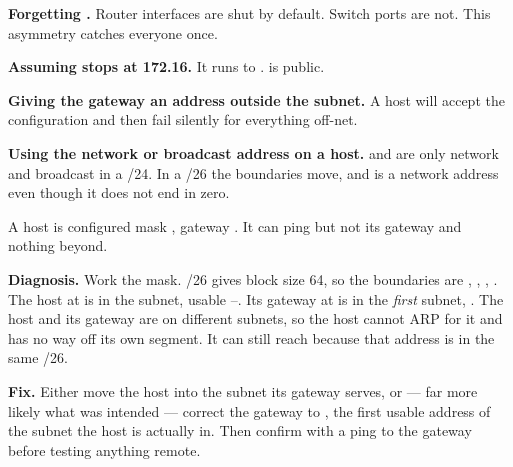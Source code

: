 \begin{pitfall}
\begin{tight}
  \item \textbf{Forgetting .} Router interfaces are shut by
        default. Switch ports are not. This asymmetry catches everyone once.
  \item \textbf{Assuming  stops at 172.16.} It runs to
        .  is public.
  \item \textbf{Giving the gateway an address outside the subnet.} A host will
        accept the configuration and then fail silently for everything off-net.
  \item \textbf{Using the network or broadcast address on a host.}  and
         are only network and broadcast in a /24. In a /26 the
        boundaries move, and  is a network address even though
        it does not end in zero.
\end{tight}
\end{pitfall}

\begin{breakfix}
A host is configured  mask , gateway
. It can ping  but not its gateway and
nothing beyond.

\textbf{Diagnosis.} Work the mask. /26 gives block size 64, so the boundaries are
, , , . The host at  is in the
 subnet, usable --. Its gateway at
 is in the \emph{first} subnet, . The host and its
gateway are on different subnets, so the host cannot ARP for it and has no way
off its own segment. It can still reach  because that address is in the
same /26.

\textbf{Fix.} Either move the host into the subnet its gateway serves, or --- far
more likely what was intended --- correct the gateway to , the
first usable address of the subnet the host is actually in. Then confirm with a
ping to the gateway before testing anything remote.
\end{breakfix}

